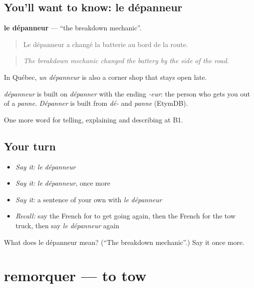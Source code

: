 \subsection*{You'll want to know: le dépanneur}
\textbf{le dépanneur} — \textquotedblleft{}the breakdown mechanic\textquotedblright{}.

\begin{quote}
Le dépanneur a changé la batterie au bord de la route.
\end{quote}

\begin{quote}
\emph{The breakdown mechanic changed the battery by the side of the road.}
\end{quote}

In Québec, \emph{un dépanneur} is also a corner shop that stays open late.

\begin{cousinweb}
\emph{dépanneur} is built on \emph{dépanner} with the ending \emph{-eur}: the person who gets you out of a \emph{panne}. \emph{Dépanner} is built from \emph{dé-} and \emph{panne} (EtymDB).
\end{cousinweb}

\begin{grammarlens}[title={What you've built}]
One more word for telling, explaining and describing at B1.
\end{grammarlens}

\subsection*{Your turn}
\begin{itemize}
\raggedright
  \item \emph{Say it:} \emph{le dépanneur}
  \item \emph{Say it:} \emph{le dépanneur}, once more
  \item \emph{Say it:} a sentence of your own with \emph{le dépanneur}
  \item \emph{Recall:} say the French for to get going again, then the French for the tow truck, then say \emph{le dépanneur} again
\end{itemize}

\begin{tcolorbox}[breakable,colback=teal!4,colframe=teal!35!black,title={Before you move on}]
What does le dépanneur mean? (\textquotedblleft{}The breakdown mechanic\textquotedblright{}.) Say it once more.
\end{tcolorbox}
\section[remorquer]{remorquer — to tow}

